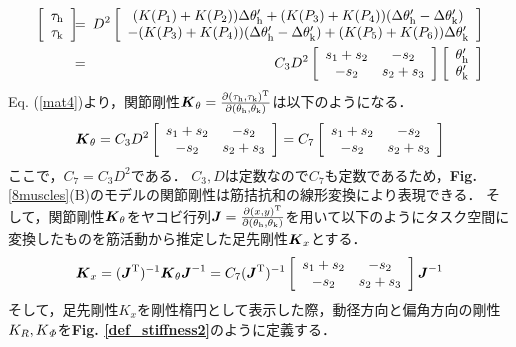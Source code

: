 \begin{eqnarray}
 \label{mat4}
 \left[
  \begin{array}{c}
   \tau_{\rm h} \\
   \tau_{\rm k}
  \end{array}
 \right]
 \hspace{-0.5em}&=&\hspace{-0.5em}D^2
 \left[
  \begin{array}{c}
   (K(P_1)+K(P_2))\Delta\theta'_{\rm h}+(K(P_3)+K(P_4))(\Delta\theta'_{\rm h}-\Delta\theta'_{\rm k}) \\
   -(K(P_3)+K(P_4))(\Delta\theta'_{\rm h}-\Delta\theta'_{\rm k})+(K(P_5)+K(P_6))\Delta\theta'_{\rm k}
  \end{array}
 \right] \nonumber \\
 &=&\hspace{-0.5em}C_3D^2
 \left[
  \begin{array}{cc}
   s_1+s_2 & -s_2 \\
   -s_2 & s_2+s_3
  \end{array}
 \right]
 \left[
  \begin{array}{c}
   \theta'_{\rm h} \\
   \theta'_{\rm k}
  \end{array}
 \right]
\end{eqnarray}
Eq. (\ref{mat4})より，関節剛性$\mbox{\boldmath $K$}_{\theta}=\frac{\partial(\tau_{\rm h},\tau_{\rm k})^{\rm T}}{\partial(\theta_{\rm h},\theta_{\rm k})}$は以下のようになる．
\begin{eqnarray}
 \label{joint_stiffness}
 \mbox{\boldmath $K$}_{\theta}=C_3D^2
 \left[
  \begin{array}{cc}
   s_1+s_2 & -s_2 \\
   -s_2 & s_2+s_3
  \end{array}
 \right]=C_7
 \left[
  \begin{array}{cc}
   s_1+s_2 & -s_2 \\
   -s_2 & s_2+s_3
  \end{array}
 \right]
\end{eqnarray}
ここで，$C_7=C_3D^2$である．
$C_3,D$は定数なので$C_7$も定数であるため，{\bf Fig. }\ref{8muscles}(B)のモデルの関節剛性は筋拮抗和の線形変換により表現できる．
そして，関節剛性$\mbox{\boldmath $K$}_{\theta}$をヤコビ行列$\mbox{\boldmath $J$}=\frac{\partial(x,y)^{\rm T}}{\partial(\theta_{\rm h},\theta_{\rm k})}$を用いて以下のようにタスク空間に変換したものを筋活動から推定した足先剛性$\mbox{\boldmath $K$}_x$とする．
\begin{eqnarray}
 \label{def_stiffness}
 \mbox{\boldmath $K$}_x=(\mbox{\boldmath $J$}^{\rm T})^{-1}\mbox{\boldmath $K$}_{\theta}\mbox{\boldmath $J$}^{-1}=C_7(\mbox{\boldmath $J$}^{\rm T})^{-1}
 \left[
  \begin{array}{cc}
   s_1+s_2 & -s_2 \\
   -s_2 & s_2+s_3
  \end{array}
 \right]\mbox{\boldmath $J$}^{-1}
\end{eqnarray}
そして，足先剛性$K_x$を剛性楕円として表示した際，動径方向と偏角方向の剛性$K_R,K_{\it \Phi}$を{\bf Fig. \ref{def_stiffness2}}のように定義する．

